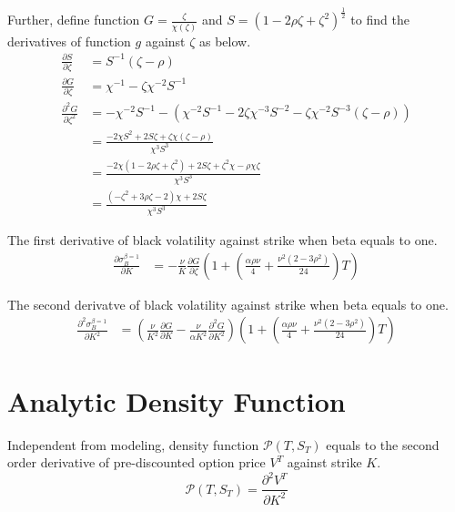 \documentclass{article}
\begin{document}
Further, define function $ G = \frac{\zeta}{\chi\left(\zeta\right)} $ and $ S = \left(1 - 2 \rho \zeta + \zeta^2\right)^{\frac{1}{2}} $ to find the derivatives of function $ g $ against $ \zeta $ as below.
\begin{subequations}
    \begin{align}
        \frac{\partial S}{\partial \zeta} &= S^{-1} \left(\zeta - \rho\right) \\
        \frac{\partial G}{\partial \zeta} &= \chi^{-1} - \zeta \chi^{-2} S^{-1} \\
        \frac{\partial^2 G}{\partial \zeta^2} &= -\chi^{-2} S^{-1} - \left(\chi^{-2} S^{-1} - 2 \zeta \chi^{-3} S^{-2} - \zeta \chi^{-2} S^{-3} \left(\zeta - \rho\right)\right) \nonumber \\
        &= \frac{-2 \chi S^2 + 2 S \zeta + \zeta \chi \left(\zeta - \rho\right)}{\chi^3 S^3} \nonumber \\
        &= \frac{-2 \chi \left(1 - 2\rho \zeta + \zeta^2\right) + 2 S \zeta + \zeta^2 \chi - \rho \chi \zeta}{\chi^3 S^3} \nonumber \\
        &= \frac{\left(-\zeta^2 + 3 \rho \zeta - 2\right) \chi + 2 S \zeta}{\chi^3 S^3}
    \end{align}
\end{subequations}

The first derivative of black volatility against strike when beta equals to one.
\begin{align} \label{dSigdK}
    \frac{\partial \sigma_{B}^{\beta=1}}{\partial K} &= -\frac{\nu}{K} \frac{\partial G}{\partial \zeta} \left(1 + \left(\frac{\alpha \rho \nu}{4} + \frac{\nu^2 \left(2 - 3 \rho^2\right)}{24}\right) T\right)
\end{align}

The second derivatve of black volatility against strike when beta equals to one.
\begin{align} \label{dSig2dK2}
    \frac{\partial^2 \sigma_{B}^{\beta=1}}{\partial K^2} &= \left(\frac{\nu}{K^2} \frac{\partial G}{\partial K} - \frac{\nu}{\alpha K^2} \frac{\partial^2 G}{\partial K^2}\right) \left(1 + \left(\frac{\alpha \rho \nu}{4} + \frac{\nu^2 \left(2 - 3 \rho^2\right)}{24}\right) T\right)
\end{align}


\section{Analytic Density Function}

Independent from modeling, density function $ \mathcal{P}\left(T, S_T\right) $ equals to the second order derivative of pre-discounted option price $ V^T $ against strike $ K $.
\begin{equation}
    \mathcal{P}\left(T, S_T\right) = \frac{\partial^2 V^T}{\partial K^2}
\end{equation}
\end{document}
